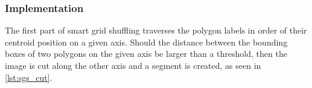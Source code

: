 \documentclass[10pt]{book}
\begin{document}
\subsubsection{Implementation}

The first part of smart grid shuffling traverses the polygon labels in order of their centroid position on a given axis. Should the distance between the bounding boxes of two polygons on the given axis be larger than a threshold, then the image is cut along the other axis and a segment is created, as seen in \autoref{lst:sgs_cut}.







\end{document}
